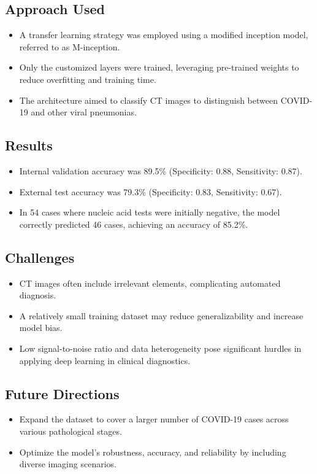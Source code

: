 \subsection*{Approach Used}
\begin{itemize}
    \item A transfer learning strategy was employed using a modified inception model, referred to as M-inception.
    \item Only the customized layers were trained, leveraging pre-trained weights to reduce overfitting and training time.
    \item The architecture aimed to classify CT images to distinguish between COVID-19 and other viral pneumonias.
\end{itemize}

\subsection*{Results}
\begin{itemize}
    \item Internal validation accuracy was 89.5\% (Specificity: 0.88, Sensitivity: 0.87).
    \item External test accuracy was 79.3\% (Specificity: 0.83, Sensitivity: 0.67).
    \item In 54 cases where nucleic acid tests were initially negative, the model correctly predicted 46 cases, achieving an accuracy of 85.2\%.
\end{itemize}

\subsection*{Challenges}
\begin{itemize}
    \item CT images often include irrelevant elements, complicating automated diagnosis.
    \item A relatively small training dataset may reduce generalizability and increase model bias.
    \item Low signal-to-noise ratio and data heterogeneity pose significant hurdles in applying deep learning in clinical diagnostics.
\end{itemize}

\subsection*{Future Directions}
\begin{itemize}
    \item Expand the dataset to cover a larger number of COVID-19 cases across various pathological stages.
    \item Optimize the model's robustness, accuracy, and reliability by including diverse imaging scenarios.
\end{itemize}

